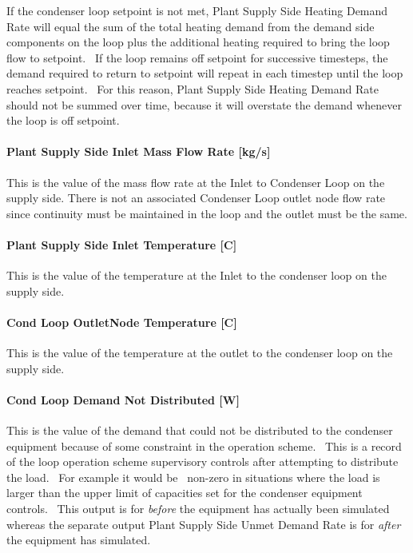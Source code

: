 If the condenser loop setpoint is not met, Plant Supply Side Heating Demand Rate will equal the sum of the total heating demand from the demand side components on the loop plus the additional heating required to bring the loop flow to setpoint.~ If the loop remains off setpoint for successive timesteps, the demand required to return to setpoint will repeat in each timestep until the loop reaches setpoint.~ For this reason, Plant Supply Side Heating Demand Rate should not be summed over time, because it will overstate the demand whenever the loop is off setpoint.

\paragraph{Plant Supply Side Inlet Mass Flow Rate {[}kg/s{]}}\label{plant-supply-side-inlet-mass-flow-rate-kgs-1}

This is the value of the mass flow rate at the Inlet to Condenser Loop on the supply side. There is not an associated Condenser Loop outlet node flow rate since continuity must be maintained in the loop and the outlet must be the same.

\paragraph{Plant Supply Side Inlet Temperature {[}C{]}}\label{plant-supply-side-inlet-temperature-c-1}

This is the value of the temperature at the Inlet to the condenser loop on the supply side.

\paragraph{Cond Loop OutletNode Temperature {[}C{]}}\label{cond-loop-outletnode-temperature-c}

This is the value of the temperature at the outlet to the condenser loop on the supply side.

\paragraph{Cond Loop Demand Not Distributed {[}W{]}}\label{cond-loop-demand-not-distributed-w}

This is the value of the demand that could not be distributed to the condenser equipment because of some constraint in the operation scheme.~ This is a record of the loop operation scheme supervisory controls after attempting to distribute the load.~ For example it would be~ non-zero in situations where the load is larger than the upper limit of capacities set for the condenser equipment controls.~ This output is for \emph{before} the equipment has actually been simulated whereas the separate output Plant Supply Side Unmet Demand Rate is for \emph{after} the equipment has simulated.


